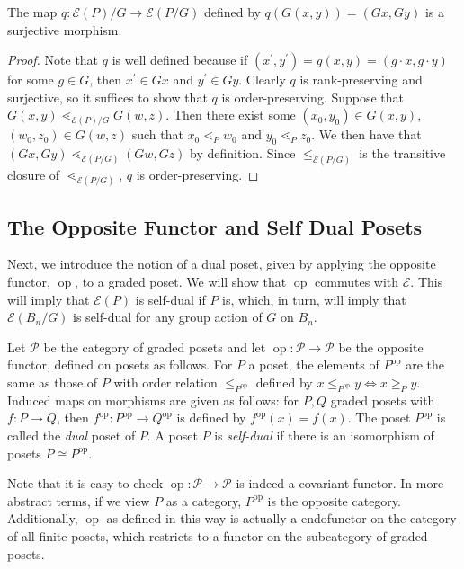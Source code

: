 \documentclass[smallextended]{svjour3}       %
\numberwithin{equation}{section}
\newcommand\ssec{\subsection}
\renewcommand{\iff}{\Leftrightarrow}
\newcommand\op{\operatorname{op}}
\begin{document}
\begin{proposition}\label{prop:surjection_between_F_quotients}
The map $q\colon \mathcal E(P)/G\rightarrow \mathcal E(P/G)$ defined by $q(G(x, y)) = (Gx,Gy)$ is a surjective morphism.
\end{proposition}

\begin{proof}

Note that $q$ is well defined because if $(x^\prime, y^\prime) = g(x, y) = (g\cdot x, g\cdot y)$ for some $g\in G$, then $x^\prime\in Gx$ and $y^\prime\in Gy$.  Clearly $q$ is rank-preserving and surjective, so it suffices to show that $q$ is order-preserving.  Suppose that $G(x, y) \lessdot_{\mathcal E(P)/G} G(w, z)$.  Then there exist some $(x_0, y_0)\in G(x, y)$, $(w_0, z_0)\in G(w, z)$ such that $x_0\lessdot_P w_0$ and $y_0\lessdot_P z_0$.  We then have that $(Gx, Gy) \lessdot_{\mathcal E(P/G)} (Gw, Gz)$ by definition. Since $\le_{\mathcal E(P/G)}$ is the transitive closure of $\lessdot_{\mathcal E(P/G)}$, $q$ is order-preserving.
\end{proof}

\ssec{The Opposite Functor and Self Dual Posets}
\label{ssec:dual_posets}

Next, we introduce the notion of a dual poset, given by applying the opposite functor, $\op$, to a graded poset. We will show that $\op$ commutes with $\mathcal E$. This will imply that $\mathcal E(P)$ is self-dual if $P$ is, which, in turn, will imply that $\mathcal E(B_n/G)$ is self-dual for any group action of $G$ on $B_n$.

\begin{definition}
Let $\mathcal P$ be the category of graded posets and let $\op\colon\mathcal P \rightarrow \mathcal P$ be the opposite functor, defined on posets as follows. For $P$ a poset, the elements of $P^{\op}$ are the same as those of $P$ with order relation $\le_{P^{\op}}$ defined by $x \leq_{P^{\op}} y \iff x \geq_P y$. Induced maps on morphisms are given as follows: for $P,Q$ graded posets with $f\colon P \rightarrow Q$, then $f^{\op}\colon P^{\op} \rightarrow Q^{\op}$ is defined by $f^{\op}(x) = f(x)$. The poset $P^{\op}$ is called the {\it dual} poset of $P$. A poset $P$ is {\it self-dual} if there is an isomorphism of posets $P \cong P^{\op}$.
\end{definition}

\begin{remark}
Note that it is easy to check $\op\colon\mathcal P \rightarrow \mathcal P$ is indeed a covariant functor. In more abstract terms, if we view $P$ as a category, $P^{\op}$ is the opposite category. Additionally, $\op$ as defined in this way is actually a endofunctor on the category of all finite posets, which restricts to a functor on the subcategory of graded posets.
\end{remark}
\end{document}
